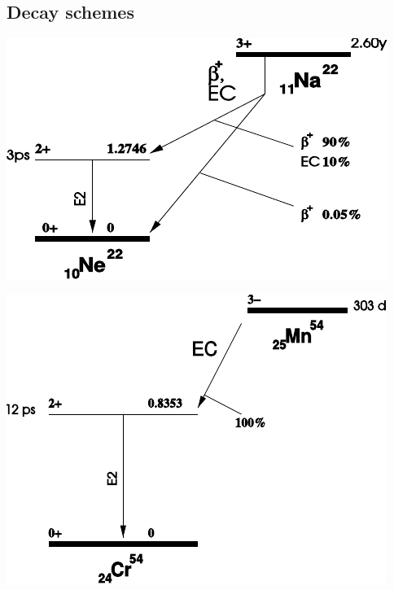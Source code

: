 \subsection{Decay schemes}
%
\vspace{10mm}
%
\begin{multicols}{2}
%
\minipage{\linewidth}
    \begin{center}
        \captionsetup{type=figure}
        \begin{adjustbox}{max width=\linewidth, keepaspectratio}
            \includegraphics[]{pdf/22Na}
        \end{adjustbox}
        \label{fig:22NaDecayScheme}
    \end{center}
\endminipage
%
\vspace{10mm}
%
\minipage{\linewidth}
    \begin{center}
        \captionsetup{type=figure}
        \begin{adjustbox}{max width=\linewidth, keepaspectratio}
            \includegraphics[]{pdf/54Mn}

\end{adjustbox}
\end{center}
\end{multicols}
